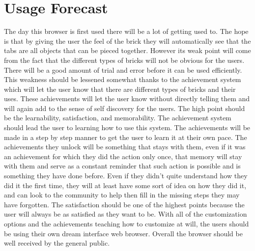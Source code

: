 \documentclass[11pt]{article}
\begin{document}
\section{Usage Forecast}
The day this browser is first used there will be a lot of getting used to. The hope is that by giving the user the feel of the brick they will automatically see that the tabs are all objects that can be pieced together. However its weak point will come from the fact that the different types of bricks will not be obvious for the users. There will be a good amount of trial and error before it can be used efficiently. This weakness should be lessened somewhat thanks to the achievement system which will let the user know that there are different types of bricks and their uses. These achievements will let the user know without directly telling them and will again add to the sense of self discovery for the users. The high point should be the learnability, satisfaction, and memorability. The achievement system should lead the user to learning how to use this system. The achievements will be made in a step by step manner to get the user to learn it at their own pace. The achievements they unlock will be something that stays with them, even if it was an achievement for which they did the action only once, that memory will stay with them and serve as a constant reminder that such action is possible and is something they have done before. Even if they didn’t quite understand how they did it the first time, they will at least have some sort of idea on how they did it, and can look to the community to help then fill in the missing steps they may have forgotten. The satisfaction should be one of the highest points because the user will always be as satisfied as they want to be. With all of the customization options and the achievements teaching how to customize at will, the users should be using their own dream interface web browser. Overall the browser should be well received by the general public.
%
\end{document}
